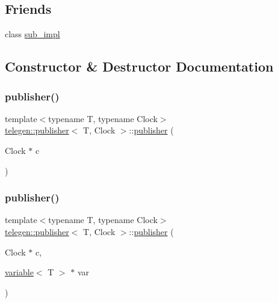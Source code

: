 \subsection*{Friends}
\begin{DoxyCompactItemize}
\item 
class \hyperlink{classtelegen_1_1publisher_a378ff3f48e0298988ffbb9d03c4f5ac9}{sub\+\_\+impl}
\end{DoxyCompactItemize}


\subsection{Constructor \& Destructor Documentation}
\mbox{\label{classtelegen_1_1publisher_a6fc6fb74fe2e1db1de31a9ef434a851f}} 
\subsubsection{\texorpdfstring{publisher()}{publisher()}\hspace{0.1cm}{\footnotesize\ttfamily [1/3]}}
{\footnotesize\ttfamily template$<$typename T, typename Clock$>$ \\
\hyperlink{classtelegen_1_1publisher}{telegen\+::publisher}$<$ T, Clock $>$\+::\hyperlink{classtelegen_1_1publisher}{publisher} (\begin{DoxyParamCaption}\item[{Clock $\ast$}]{c }\end{DoxyParamCaption})\hspace{0.3cm}{\ttfamily [inline]}}

\mbox{\label{classtelegen_1_1publisher_adc45d3b53b7532c8b0d76673ed32f4f3}} 
\subsubsection{\texorpdfstring{publisher()}{publisher()}\hspace{0.1cm}{\footnotesize\ttfamily [2/3]}}
{\footnotesize\ttfamily template$<$typename T, typename Clock$>$ \\
\hyperlink{classtelegen_1_1publisher}{telegen\+::publisher}$<$ T, Clock $>$\+::\hyperlink{classtelegen_1_1publisher}{publisher} (\begin{DoxyParamCaption}\item[{Clock $\ast$}]{c,  }\item[{\hyperlink{classtelegen_1_1variable}{variable}$<$ T $>$ $\ast$}]{var }\end{DoxyParamCaption})\hspace{0.3cm}{\ttfamily [inline]}}

